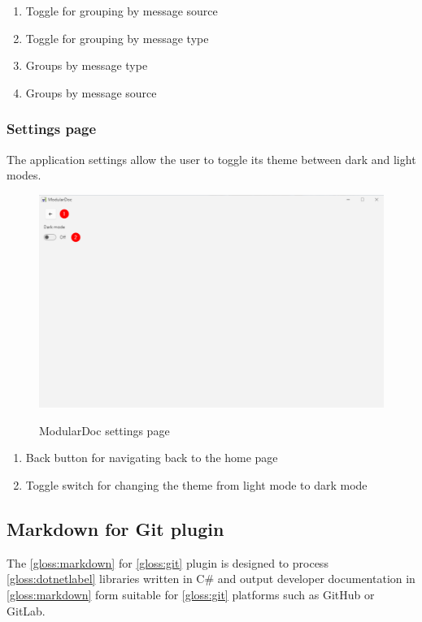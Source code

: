 \begin{enumerate}
    \item Toggle for grouping by message source
    \item Toggle for grouping by message type
    \item Groups by message type
    \item Groups by message source
\end{enumerate}

\pagebreak
\subsubsection{Settings page}

The application settings allow the user to toggle its theme between dark and light modes.

\begin{figure}[H]
    \includegraphics[width=\linewidth]{img/modularDocSettings.png}
    \label{fig:modularDocSettingsPage}
    \caption{ModularDoc settings page}
\end{figure}

\begin{enumerate}
    \item Back button for navigating back to the home page
    \item Toggle switch for changing the theme from light mode to dark mode
\end{enumerate}

\pagebreak
\subsection{Markdown for Git plugin}

The \ref{gloss:markdown} for \ref{gloss:git} plugin is designed to process \ref{gloss:dotnetlabel} libraries written in C\# and output developer documentation in \ref{gloss:markdown} form suitable for \ref{gloss:git} platforms such as GitHub or GitLab.

